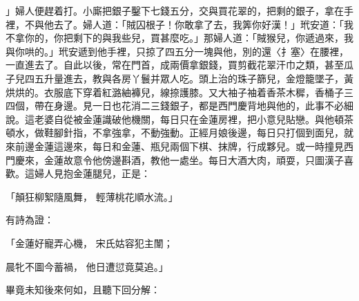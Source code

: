 \begin{showcontents}{}
」婦人便趕着打。小廝把銀子鑿下七錢五分，交與買花翠的，把剩的銀子，拿在手裡，不與他去了。婦人道：「賊囚根子！你敢拿了去，我筭你好漢！」玳安道：「我不拿你的，你把剩下的與我些兒，買甚麼吃。」那婦人道：「賊猴兒，你遞過來，我與你哄的。」玳安遞到他手裡，只掠了四五分一塊與他，別的還〈扌塞〉在腰裡，一直進去了。自此以後，常在門首，成兩價拿銀錢，買剪截花翠汗巾之類，甚至瓜子兒四五升量進去，教與各房丫鬟并眾人吃。頭上治的珠子篩兒，金燈籠墜子，黃烘烘的。衣服底下穿着紅潞紬褲兒，線捺護膝。又大袖子袖着香茶木穉，香桶子三四個，帶在身邊。見一日也花消二三錢銀子，都是西門慶背地與他的，此事不必細說。這老婆自從被金蓮識破他機關，每日只在金蓮房裡，把小意兒貼戀。與他頓茶頓水，做鞋腳針指，不拿強拿，不動強動。正經月娘後邊，每日只打個到面兒，就來前邊金蓮這邊來，每日和金蓮、瓶兒兩個下棋、抹牌，行成夥兒。或一時撞見西門慶來，金蓮故意令他傍邊斟酒，教他一處坐。每日大酒大肉，頑耍，只圖漢子喜歡。這婦人見抱金蓮腿兒，正是：

「顛狂柳絮隨風舞，  輕薄桃花順水流。」

有詩為證：

「金蓮好寵弄心機，  宋氏姑容犯主闈；

晨牝不圖今蓄禍，  他日遭愆竟莫追。」

畢竟未知後來何如，且聽下回分解：




\end{showcontents}


